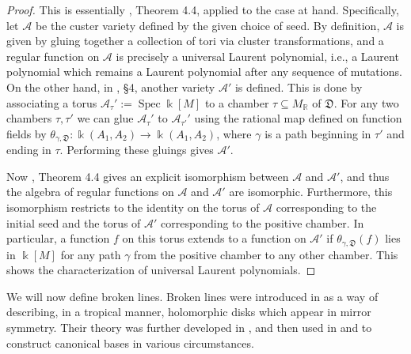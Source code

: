\documentclass[11pt]{amsart}
\theoremstyle{remark}
\numberwithin{equation}{section}
\newcommand{\RR}{\mathbb{R}}
\newcommand{\cA}{\mathcal{A}}
\newcommand{\fD}{\mathfrak{D}}
\newcommand{\Spec}{\operatorname{Spec}}
\begin{document}
\begin{proof}
  This is essentially \cite{GHKK}, Theorem 4.4, applied to the case at hand.
  Specifically, let $\cA$ be the custer variety defined by the given choice of
  seed. By definition, $\cA$ is given by gluing together a collection of tori
  via cluster transformations, and a regular function on $\cA$ is precisely a
  universal Laurent polynomial, i.e., a Laurent polynomial which remains a
  Laurent polynomial after any sequence of mutations. On the other hand, in
  \cite{GHKK}, \S 4, another variety $\cA'$ is defined. This is done by
  associating a torus $\cA_{\tau}':= \Spec \Bbbk[M]$ to a chamber $\tau\subseteq
  M_{\RR}$ of $\fD$. For any two chambers $\tau,\tau'$ we can glue $\cA_{\tau}'$
  to $\cA_{\tau'}'$ using the rational map defined on function fields by
  $\theta_{\gamma,\fD}:\Bbbk(A_1,A_2)\rightarrow \Bbbk(A_1,A_2)$, where $\gamma$
  is a path beginning in $\tau'$ and ending in $\tau$. Performing these gluings
  gives $\cA'$.

  Now \cite{GHKK}, Theorem 4.4 gives an explicit isomorphism between $\cA$ and
  $\cA'$, and thus the algebra of regular functions on $\cA$ and $\cA'$ are
  isomorphic. Furthermore, this isomorphism restricts to the identity on the
  torus of $\cA$ corresponding to the initial seed and the torus of $\cA'$
  corresponding to the positive chamber. In particular, a function $f$ on this
  torus extends to a function on $\cA'$ if $\theta_{\gamma,\fD}(f)$ lies in
  $\Bbbk[M]$ for any path $\gamma$ from the positive chamber to any other
  chamber. This shows the characterization of universal Laurent polynomials.
\end{proof}

We will now define broken lines. Broken lines were introduced in \cite{G10} as a
way of describing, in a tropical manner,  holomorphic disks which appear in
mirror symmetry.  Their theory was further developed in \cite{CPS}, and then
used in \cite{GHK11} and \cite{GHKK} to construct canonical bases in various
circumstances.
\end{document}
